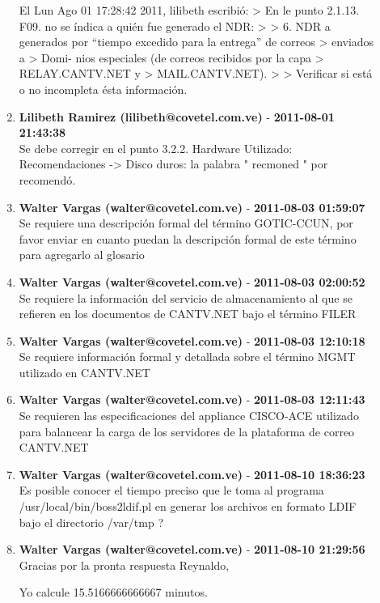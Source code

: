 \begin{description}
\begin{enumerate}
El Lun Ago 01 17:28:42 2011, lilibeth escribió:
> En le punto 2.1.13. F09. no se índica a quién fue generado el NDR:
>
> 6. NDR a generados por “tiempo excedido para la entrega” de correos
> enviados a
> Domi- nios especiales (de correos recibidos por la capa
> RELAY.CANTV.NET y
> MAIL.CANTV.NET).
>
> Verificar si está o no incompleta ésta información.        \item {\bfseries Lilibeth Ramirez (lilibeth@covetel.com.ve)  } - {\bfseries 2011-08-01 21:43:38} \\ Se debe corregir en el punto 3.2.2. Hardware Utilizado: Recomendaciones ->
Disco duros: la palabra " recmoned " por recomendó.        \item {\bfseries Walter Vargas (walter@covetel.com.ve)  } - {\bfseries 2011-08-03 01:59:07} \\ Se requiere una descripción formal del término GOTIC-CCUN, por favor enviar en cuanto puedan la descripción formal de este término para agregarlo al glosario        \item {\bfseries Walter Vargas (walter@covetel.com.ve)  } - {\bfseries 2011-08-03 02:00:52} \\ Se requiere la información del servicio de almacenamiento al que se refieren en los documentos de CANTV.NET bajo el término FILER        \item {\bfseries Walter Vargas (walter@covetel.com.ve)  } - {\bfseries 2011-08-03 12:10:18} \\ Se requiere información formal y detallada sobre el término MGMT utilizado en CANTV.NET        \item {\bfseries Walter Vargas (walter@covetel.com.ve)  } - {\bfseries 2011-08-03 12:11:43} \\ Se requieren las especificaciones del appliance CISCO-ACE utilizado para balancear la carga de los servidores de la plataforma de correo CANTV.NET        \item {\bfseries Walter Vargas (walter@covetel.com.ve)  } - {\bfseries 2011-08-10 18:36:23} \\ Es posible conocer el tiempo preciso que le toma al programa /usr/local/bin/boss2ldif.pl en generar los archivos  en formato  LDIF  bajo el directorio /var/tmp ?         \item {\bfseries Walter Vargas (walter@covetel.com.ve)  } - {\bfseries 2011-08-10 21:29:56} \\ Gracias por la pronta respuesta Reynaldo, 

Yo calcule 15.5166666666667 minutos.


\end{enumerate}
\end{description}
